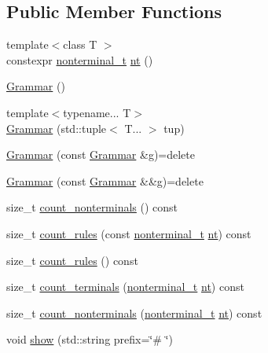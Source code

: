\subsection*{Public Member Functions}
\begin{DoxyCompactItemize}
\item 
{\footnotesize template$<$class T $>$ }\\constexpr \hyperlink{_nonterminal_8h_a1c5bfe9b903f69c83bbde5da7035fef3}{nonterminal\+\_\+t} \hyperlink{class_grammar_a047b55bfbd87c52e9d969af62c2932ab}{nt} ()
\item 
\hyperlink{class_grammar_a2fa1d41e021616790a5ec8f4b3de9b08}{Grammar} ()
\item 
{\footnotesize template$<$typename... T$>$ }\\\hyperlink{class_grammar_a7db6840d96e910a788968ebb2fe62df4}{Grammar} (std\+::tuple$<$ T... $>$ tup)
\item 
\hyperlink{class_grammar_a70df918794a43cbd26bae1096c92dead}{Grammar} (const \hyperlink{class_grammar}{Grammar} \&g)=delete
\item 
\hyperlink{class_grammar_a008b2bd47d150afe8ab304e6d213f0ba}{Grammar} (const \hyperlink{class_grammar}{Grammar} \&\&g)=delete
\item 
size\+\_\+t \hyperlink{class_grammar_a4aa05c747026932672a24fa1f7134115}{count\+\_\+nonterminals} () const
\item 
size\+\_\+t \hyperlink{class_grammar_a90a765c97b89f2f4cf12b6b4c2a3d019}{count\+\_\+rules} (const \hyperlink{_nonterminal_8h_a1c5bfe9b903f69c83bbde5da7035fef3}{nonterminal\+\_\+t} \hyperlink{class_grammar_a047b55bfbd87c52e9d969af62c2932ab}{nt}) const
\item 
size\+\_\+t \hyperlink{class_grammar_a576605ca6ee9693b762a40c477aa4889}{count\+\_\+rules} () const
\item 
size\+\_\+t \hyperlink{class_grammar_a5121201035b5d5cd0a1d4251b1f73056}{count\+\_\+terminals} (\hyperlink{_nonterminal_8h_a1c5bfe9b903f69c83bbde5da7035fef3}{nonterminal\+\_\+t} \hyperlink{class_grammar_a047b55bfbd87c52e9d969af62c2932ab}{nt}) const
\item 
size\+\_\+t \hyperlink{class_grammar_a335c2679b0db2290a1a0da8910f0bcdd}{count\+\_\+nonterminals} (\hyperlink{_nonterminal_8h_a1c5bfe9b903f69c83bbde5da7035fef3}{nonterminal\+\_\+t} \hyperlink{class_grammar_a047b55bfbd87c52e9d969af62c2932ab}{nt}) const
\item 
void \hyperlink{class_grammar_a8d661258f08b7cc4d154d59bfbbc1f68}{show} (std\+::string prefix=\char`\"{}\# \char`\"{})

\end{DoxyCompactItemize}
